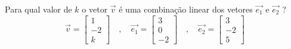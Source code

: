 \begin{exeresol}
 Para qual valor de $k$ o vetor $\vec{v}$ é uma combinação linear dos vetores $\vec{e_1}$ e $\vec{e_2}$ ?
\begin{equation}
  \vec{v} = 
\left[
  \begin{array}{c}
  1 \\
  -2 \\
  k
 \end{array}
\right] \quad , \quad
 \vec{e_1} = 
  \left[
  \begin{array}{c}
  3 \\
  0 \\
  -2
 \end{array}
\right] \quad , \quad
 \vec{e_2} = 
  \left[
  \begin{array}{c}
  3 \\
  -2 \\
  5
 \end{array}
\right]
\end{equation}
\end{exeresol}
